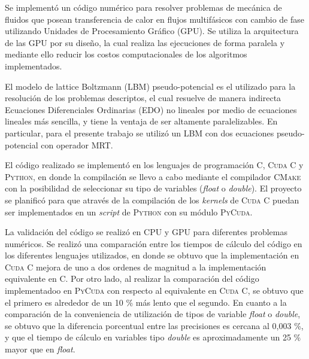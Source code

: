 \begin{resumen}%

Se implementó un código numérico para resolver problemas de mecánica de fluidos que posean transferencia de calor en flujos multifásicos con cambio de fase utilizando Unidades de Procesamiento Gráfico (GPU). Se utiliza la arquitectura de las GPU por su diseño, la cual realiza las ejecuciones de forma paralela y mediante ello reducir los costos computacionales de los algoritmos implementados.

El modelo de lattice Boltzmann (LBM) pseudo-potencial es el utilizado para la resolución de los problemas descriptos, el cual resuelve de manera indirecta Ecuaciones Diferenciales Ordinarias (EDO) no lineales por medio de ecuaciones lineales más sencilla, y tiene la ventaja de ser altamente paralelizables. En particular, para el presente trabajo se utilizó un LBM con dos ecuaciones pseudo-potencial con operador MRT.

El código realizado se implementó en los lenguajes de programación \textsc{C}, \textsc{Cuda C} y \textsc{Python}, en donde la compilación se llevo a cabo mediante el compilador \textsc{CMake} con la posibilidad de seleccionar su tipo de variables (\textit{float} o \textit{double}). El proyecto se planificó para que através de la compilación de los \textit{kernels} de \textsc{Cuda C} puedan ser implementados en un \textit{script} de \textsc{Python} con su módulo \textsc{PyCuda}.

La validación del código se realizó en CPU y GPU para diferentes problemas numéricos. Se realizó una comparación entre los tiempos de cálculo del código en los diferentes lenguajes utilizados, en donde se obtuvo que la implementación en \textsc{Cuda C} mejora de uno a dos ordenes de magnitud a la implementación equivalente en \textsc{C}. Por otro lado, al realizar la comparación del código implementadoo en \textsc{PyCuda} con respecto al equivalente en \textsc{Cuda C}, se obtuvo que el primero es alrededor de un 10 \% más lento que el segundo. En cuanto a la comparación de la conveniencia de utilización de tipos de variable \textit{float} o \textit{double}, se obtuvo que la diferencia porcentual entre las  precisiones es cercana al 0,003 \%, y que el tiempo de cálculo en variables tipo \textit{double} es aproximadamente un 25 \% mayor que en \textit{float}.



\end{resumen}

